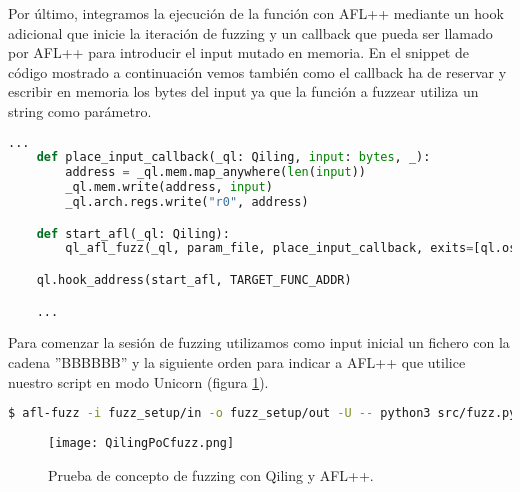 Por último, integramos la ejecución de la función con AFL++ mediante un hook adicional que inicie la iteración de fuzzing y un callback que pueda ser 
llamado por AFL++ para introducir el input mutado en memoria. En el snippet de código mostrado a continuación vemos también como el callback ha de 
reservar y escribir en memoria los bytes del input ya que la función a fuzzear utiliza un string como parámetro.

\begin{lstlisting}[language=python, caption=Integración de AFL++ con nuestro script de Qiling., captionpos=b,
    frame=single, breaklines]
    ...
    def place_input_callback(_ql: Qiling, input: bytes, _):
        address = _ql.mem.map_anywhere(len(input))
        _ql.mem.write(address, input)
        _ql.arch.regs.write("r0", address)

    def start_afl(_ql: Qiling):
        ql_afl_fuzz(_ql, param_file, place_input_callback, exits=[ql.os.exit_point])

    ql.hook_address(start_afl, TARGET_FUNC_ADDR)

    ...
\end{lstlisting}

Para comenzar la sesión de fuzzing utilizamos como input inicial un fichero con la cadena ''BBBBBB'' y la siguiente orden para 
indicar a AFL++ que utilice nuestro script en modo Unicorn (figura \ref{fig:QilingPoCfuzz}). 

\begin{lstlisting}[language=bash]
    $ afl-fuzz -i fuzz_setup/in -o fuzz_setup/out -U -- python3 src/fuzz.py @@
\end{lstlisting}

\begin{figure}[H]
    \centering
    \texttt{[image: QilingPoCfuzz.png]}
    \caption{Prueba de concepto de fuzzing con Qiling y AFL++.}
    \label{fig:QilingPoCfuzz}
\end{figure}

